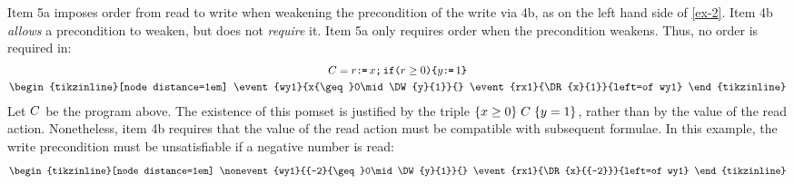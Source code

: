 Item 5a imposes order from read to write when weakening the
precondition of the write via 4b, as on the left hand side of
\eqref{ex-2}.
Item 4b \emph{allows} a precondition to weaken, but does not \emph{require} it.
Item 5a only requires order when the precondition weakens.
Thus, no order is required in: %
\begin{gather}
  \aCmd=r\GETS x\SEMI\IF{r\geq0}\THEN y\GETS1 \FI
  \label{ex555}
  \\
  \nonumber
  \hbox{\begin{tikzinline}[node distance=1em]
      \event{wy1}{x{\geq}0\mid\DW{y}{1}}{}
      \event{rx1}{\DR{x}{1}}{left=of wy1}
    \end{tikzinline}}
\end{gather}
Let $C$ be the program above.  The existence of this pomset is justified
by the triple $\{x\geq0\}\allowbreak\;C\;\allowbreak\{y=1\}$, rather than by the value of the read
action.  Nonetheless, item 4b requires that the value of the read action must
be compatible with subsequent formulae.  In this example, the write
precondition must be unsatisfiable if a negative number is read:
\begin{gather*}
  \nonumber
  \hbox{\begin{tikzinline}[node distance=1em]
      \nonevent{wy1}{{-2}{\geq}0\mid\DW{y}{1}}{}
      \event{rx1}{\DR{x}{{-2}}}{left=of wy1}
    \end{tikzinline}}
\end{gather*}


